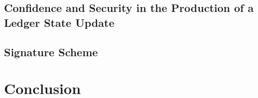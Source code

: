 \documentclass[a4paper, 12pt]{book}
\begin{document}
\section{Confidence and Security in the Production of a Ledger State Update}\label{Sec:SecLsu}




\section{Signature Scheme}\label{Sec:SSS}





\chapter*{Conclusion} \label{Cha:Con}




\printbibliography
\nocite{*}
\end{document}
